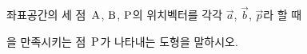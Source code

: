 좌표공간의 세 점~$\mathrm{A}$, $\mathrm{B}$, $\mathrm{P}$의 위치벡터를 각각 $\vec{a}$, $\vec{b}$, $\vec{p}$라 할 때 \par\smallskip{}\par\smallskip\noindent 을 만족시키는 점~$\mathrm{P}$가 나타내는 도형을 말하시오.
